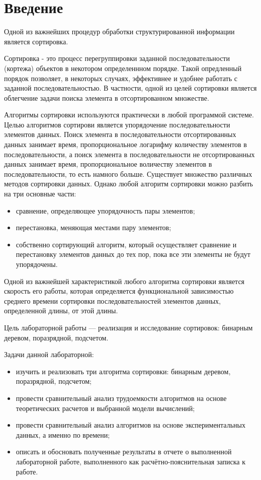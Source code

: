 \chapter*{Введение}



Одной из важнейших процедур обработки структурированной информации является сортировка.

Сортировка - это процесс перегруппировки заданной последовательности (кортежа) объектов в некотором определеннном порядке. Такой опредленный порядок позволяет, в некоторых случаях, эффективнее и удобнее работать с заданной последовательностью. В частности, одной из целей сортировки является облегчение задачи поиска элемента в отсортированном множестве. 

Алгоритмы сортировки используются практически в любой программой системе. Целью алгоритмов сортирови является упорядочение последовательности элементов данных. Поиск элемента в последовательности отсортированных данных занимает время, пропорциональное логарифму количеству элементов в последовательности, а поиск элемента в последовательности не отсортированных данных занимает время, пропорциональное воличеству элементов в последовательности, то есть намного больше. Существует множество различных методов сортировки данных. Однако любой алгоритм сортировки можно разбить на три основные части:

\begin{itemize}
	\item сравнение, определяющее упорядочность пары элементов;
	\item перестановка, меняющая местами пару элементов;
	\item собственно сортирующий алгоритм, который осуществляет сравнение
	и перестановку элементов данных до тех пор, пока все эти элементы
	не будут упорядочены.
\end{itemize}

Одной из важнейшей характеристикой любого алгоритма сортировки является скорость его работы, которая определяется функциональной зависимостью среднего времени сортировки последовательностей элементов данных, определенной длины, от этой длины.


Цель лабораторной работы --- реализация и исследование сортировок: бинарным деревом, поразрядной, подсчетом.

\newpage

Задачи данной лабораторной:

\begin{itemize}
	\item изучить и реализовать три алгоритма сортировки: бинарным деревом, поразрядной, подсчетом;
	\item провести сравнительный анализ трудоемкости алгоритмов на основе теоретических расчетов и выбранной модели вычислений;
	\item провести сравнительный анализ алгоритмов на основе экспериментальных данных, а именно по времени;
	\item описать и обосновать полученные результаты в отчете о выполненной лабораторной работе, выполненного как расчётно-пояснительная записка к работе.
\end{itemize}